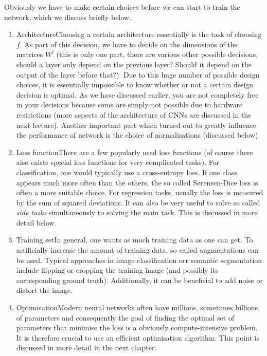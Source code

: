 Obviously we have to make certain choices before we can start to train the
network, which we discuss briefly below.
\begin{enumerate}
\item Architecture\qquad Choosing a certain architecture essentially is the task
  of choosing $f$. As part of this decision, we have to decide on the dimensions
  of the matrices $W^l$ (this is only one part, there are various other possible
  decisions, \eg should a layer only depend on the previous layer? Should it
  depend on the output of the layer before that?). Due to this huge number of
  possible design choices, it is essentially impossible to know whether or not a
  certain design decision is optimal. As we have discussed earlier, you are not
  completely free in your decisions because some are simply not possible due to
  hardware restrictions (more aspects of the architecture of CNNs are discussed
  in the next lecture). Another important part which turned out to greatly
  influence the performance of network is the choice of normalisations
  (discussed below).
\item Loss function\qquad There are a few popularly used loss functions (of
  course there also exists special loss functions for very complicated tasks).
  For classification, one would typically use a cross-entropy loss. If one class
  appears much more often than the others, the so called S{\o}rensen-Dice loss
  is often a more suitable choice. For regression tasks, usually the loss is
  measured by the sum of squared deviations. It can also be very useful to solve
  so called \emph{side tasks} simultaneously to solving the main task. This is
  discussed in more detail below.
\item Training set\qquad In general, one wants as much training data as one can
  get. To artificially increase the amount of training data, so called
  augmentations can be used. Typical approaches in image classification orr
  semantic segmentation include flipping or cropping the training image (and
  possibly its corresponding ground truth). Additionally, it can be beneficial
  to add noise or distort the image.
\item Optimisation\qquad Modern neural networks often have millions, sometimes
  billions, of parameters and consequently the goal of finding the optimal set
  of parameters that minimise the loss is a obviously compute-intensive problem.
  It is therefore crucial to use an efficient optimisation algorithm. This point
  is discussed in more detail in the next chapter.
\end{enumerate}

